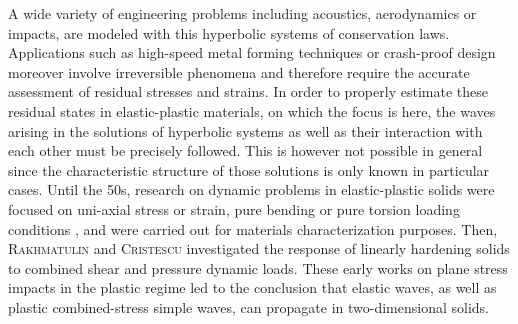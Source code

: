 A wide variety of engineering problems including acoustics, aerodynamics or impacts, are modeled with this hyperbolic systems of conservation laws.
Applications such as high-speed metal forming techniques or crash-proof design moreover involve irreversible phenomena and therefore require the accurate assessment of residual stresses and strains. 
In order to properly estimate these residual states in elastic-plastic materials, on which the focus is here, the waves arising in the solutions of hyperbolic systems as well as their interaction with each other must be precisely followed.
This is however not possible in general since the characteristic structure of those solutions is only known in particular cases.
%
Until the 50s, research on dynamic problems in elastic-plastic solids were focused on uni-axial stress or strain, pure bending or pure torsion loading conditions \cite{Taylor,vonKarman}, and were carried out for materials characterization purposes.
Then, \textsc{Rakhmatulin} \cite{Rakhmatulin} and \textsc{Cristescu} \cite{CRISTESCU19591605} investigated the response of linearly hardening solids to combined shear and pressure dynamic loads.
These early works on plane stress impacts in the plastic regime led to the conclusion that elastic waves, as well as plastic combined-stress simple waves, can propagate in two-dimensional solids. 
